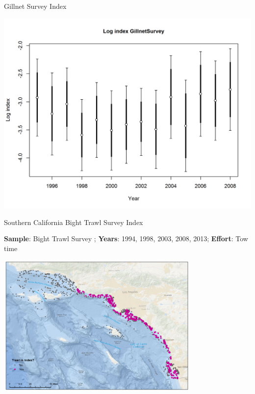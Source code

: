 \documentclass[ignorenonframetext,]{beamer}
\begin{document}
\begin{frame}{Gillnet Survey Index}

\includegraphics{r4ss/plots_mod1/index4_logcpuedata_GillnetSurvey.png}

\end{frame}

\begin{frame}{Southern California Bight Trawl Survey Index}

\textbf{Sample}: Bight Trawl Survey ; \textbf{Years}: 1994, 1998, 2003,
2008, 2013; \textbf{Effort}: Tow time

\includegraphics[height=7cm]{Figures/Fleet11_SCBSurvey_map.pdf}

\end{frame}
\end{document}

